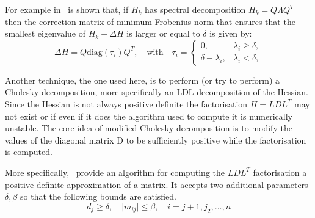 \documentclass[11pt]{report}
\begin{document}
    For example in~\cite{cheng1998modified} is shown that, if $H_k$ has spectral decomposition $H_k = Q \Lambda Q^T$ then the correction matrix of minimum Frobenius norm that ensures that the smallest eigenvalue of $H_k + \Delta H$ is larger or equal to $\delta$ is given by:
    \begin{equation*}
        \Delta H = Q \text{diag}(\tau_i) Q^T, \quad \text{with} \quad \tau_i =
        \left\{
        \begin{array}{ll}
            0,                  & \lambda_i \geq \delta, \\
            \delta - \lambda_i, & \lambda_i < \delta,
        \end{array}
        \right.
    \end{equation*}

    Another technique, the one used here, is to perform (or try to perform) a Cholesky decomposition, more specifically an LDL decomposition of the Hessian.
    Since the Hessian is not always positive definite the factorisation $H = LDL^T$ may not exist or if even if it does the algorithm used to compute it is numerically unstable.
    The core idea of modified Cholesky decomposition is to modify the values of the diagonal matrix D to be sufficiently positive while the factorisation is computed.

    More specifically,~\cite{wright2006numerical} provide an algorithm for computing the $LDL^T$ factorisation a positive definite approximation of a matrix.
    It accepts two additional parameters $\delta, \beta$ so that the following bounds are satisfied.
    \begin{equation}
        d_j \geq \delta, \quad \lvert m_{ij} \rvert \leq \beta, \quad i = j+1, j_2, \dots, n
    \end{equation}
\end{document}

